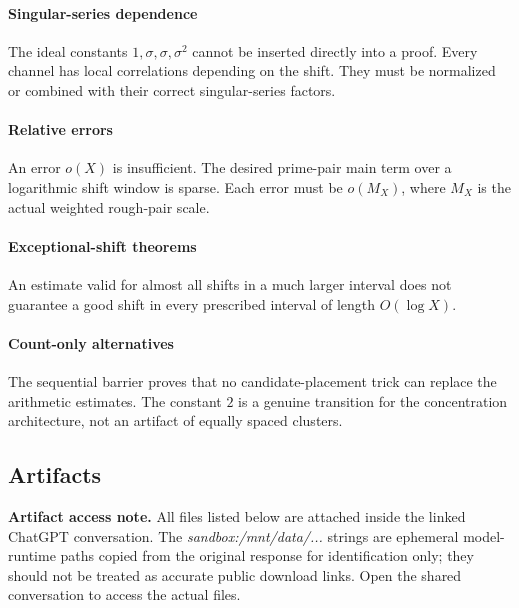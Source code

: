 \paragraph{Singular-series dependence}

The ideal constants \(1,\sigma,\sigma,\sigma^2\) cannot be inserted directly into a proof. Every channel has local correlations depending on the shift. They must be normalized or combined with their correct singular-series factors.

\paragraph{Relative errors}

An error \(o(X)\) is insufficient. The desired prime-pair main term over a logarithmic shift window is sparse. Each error must be \(o(M_X)\), where \(M_X\) is the actual weighted rough-pair scale.

\paragraph{Exceptional-shift theorems}

An estimate valid for almost all shifts in a much larger interval does not guarantee a good shift in every prescribed interval of length \(O(\log X)\).

\paragraph{Count-only alternatives}

The sequential barrier proves that no candidate-placement trick can replace the arithmetic estimates. The constant \(2\) is a genuine transition for the concentration architecture, not an artifact of equally spaced clusters.

\subsection*{Artifacts}

\noindent\textbf{Artifact access note.}
All files listed below are attached inside the linked ChatGPT conversation. The \emph{sandbox:/mnt/data/...} strings are ephemeral model-runtime paths copied from the original response for identification only; they should not be treated as accurate public download links. Open the shared conversation to access the actual files.

